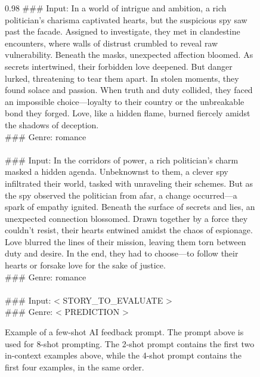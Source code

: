 \begin{figure}[H]
\begin{boxedminipage}{0.98\textwidth}
\#\#\# Input: In a world of intrigue and ambition, a rich politician's charisma captivated hearts, but the suspicious spy saw past the facade. Assigned to investigate, they met in clandestine encounters, where walls of distrust crumbled to reveal raw vulnerability. Beneath the masks, unexpected affection bloomed. As secrets intertwined, their forbidden love deepened. But danger lurked, threatening to tear them apart. In stolen moments, they found solace and passion. When truth and duty collided, they faced an impossible choice—loyalty to their country or the unbreakable bond they forged. Love, like a hidden flame, burned fiercely amidst the shadows of deception.\\
\#\#\# Genre: romance\\
\\
\#\#\# Input: In the corridors of power, a rich politician's charm masked a hidden agenda. Unbeknownst to them, a clever spy infiltrated their world, tasked with unraveling their schemes. But as the spy observed the politician from afar, a change occurred—a spark of empathy ignited. Beneath the surface of secrets and lies, an unexpected connection blossomed. Drawn together by a force they couldn't resist, their hearts entwined amidst the chaos of espionage. Love blurred the lines of their mission, leaving them torn between duty and desire. In the end, they had to choose—to follow their hearts or forsake love for the sake of justice.\\
\#\#\# Genre: romance\\
\\
\#\#\# Input: \textless{} STORY\_TO\_EVALUATE \textgreater{}\\
\#\#\# Genre: \textless{} PREDICTION \textgreater{}\\
\end{boxedminipage}
\caption{Example of a few-shot AI feedback prompt. The prompt above is used for 8-shot prompting. The 2-shot prompt contains the first two in-context examples above, while the 4-shot prompt contains the first four examples, in the same order.}
\label{app:fig:few_shot_feedback_prompt}
\end{figure}

\newpage

